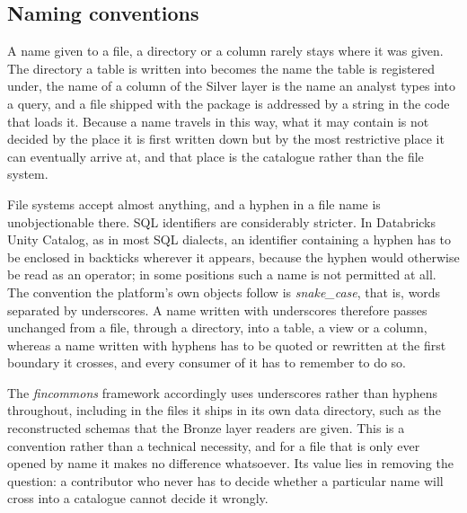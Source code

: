 \documentclass[a4paper, 11pt]{report}
\begin{document}
\subsection{Naming conventions\label{sec:intro-data-naming}}

A name given to a file, a directory or a column rarely stays where it was given. The directory a table is written into becomes the name the table is registered under, the name of a column of the Silver layer is the name an analyst types into a query, and a file shipped with the package is addressed by a string in the code that loads it. Because a name travels in this way, what it may contain is not decided by the place it is first written down but by the most restrictive place it can eventually arrive at, and that place is the catalogue rather than the file system.

File systems accept almost anything, and a hyphen in a file name is unobjectionable there. SQL identifiers are considerably stricter. In Databricks Unity Catalog, as in most SQL dialects, an identifier containing a hyphen has to be enclosed in backticks wherever it appears, because the hyphen would otherwise be read as an operator; in some positions such a name is not permitted at all. The convention the platform's own objects follow is \emph{snake\_case}, that is, words separated by underscores. A name written with underscores therefore passes unchanged from a file, through a directory, into a table, a view or a column, whereas a name written with hyphens has to be quoted or rewritten at the first boundary it crosses, and every consumer of it has to remember to do so.

The \emph{fincommons} framework accordingly uses underscores rather than hyphens throughout, including in the files it ships in its own data directory, such as the reconstructed schemas that the Bronze layer readers are given. This is a convention rather than a technical necessity, and for a file that is only ever opened by name it makes no difference whatsoever. Its value lies in removing the question: a contributor who never has to decide whether a particular name will cross into a catalogue cannot decide it wrongly.
\end{document}
